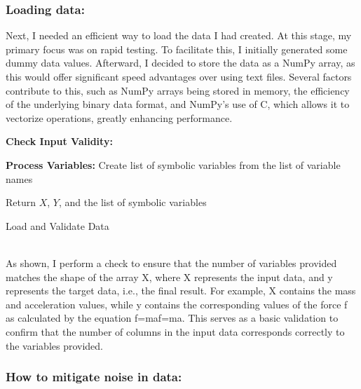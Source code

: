 \documentclass{article}
\begin{document}
\subsubsection{Loading data:}

Next, I needed an efficient way to load the data I had created. At this stage, my primary focus was on rapid testing. To facilitate this, I initially generated some dummy data values. Afterward, I decided to store the data as a NumPy array, as this would offer significant speed advantages over using text files. Several factors contribute to this, such as NumPy arrays being stored in memory, the efficiency of the underlying binary data format, and NumPy's use of C, which allows it to vectorize operations, greatly enhancing performance.\\



\begin{algorithm}[H]
\SetAlgoLined
{}

\textbf{Check Input Validity:}\;

\textbf{Process Variables:}\;
Create list of symbolic variables from the list of variable names\;

Return \(X\), \(Y\), and the list of symbolic variables\;

\caption{Load and Validate Data}
\label{alg:load_data} %
\end{algorithm}\\




As shown, I perform a check to ensure that the number of variables provided matches the shape of the array X, where X represents the input data, and y represents the target data, i.e., the final result. For example, X contains the mass and acceleration values, while y contains the corresponding values of the force f as calculated by the equation f=maf=ma. This serves as a basic validation to confirm that the number of columns in the input data corresponds correctly to the variables provided.\\

\subsubsection{How to mitigate noise in data: }
\end{document}
